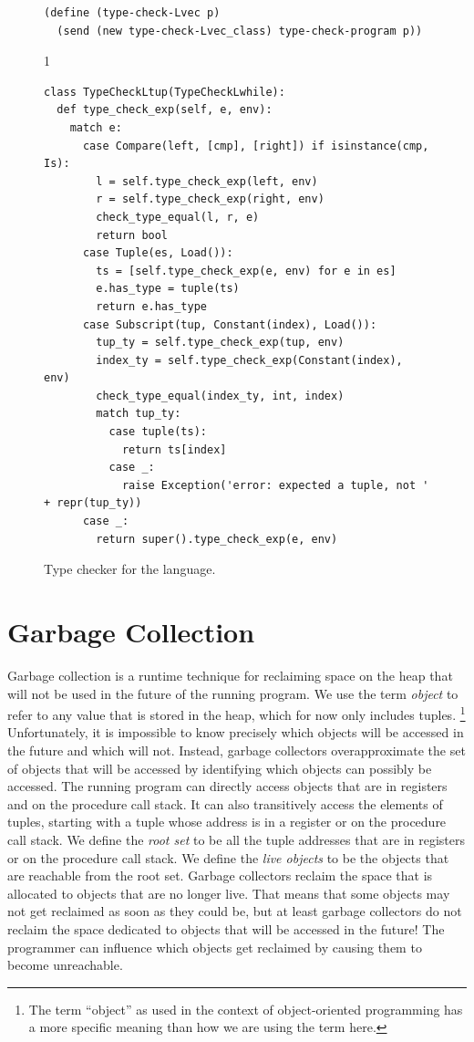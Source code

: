 \documentclass[7x10,nocrop]{TimesAPriori_MIT}%
\def\pythonEd{1}
\def\edition{1}
\begin{document}
\begin{figure}[tp]
{\begin{lstlisting}[basicstyle=\ttfamily\scriptsize]
(define (type-check-Lvec p)
  (send (new type-check-Lvec_class) type-check-program p))
\end{lstlisting}
\fi}
{\if\edition\pythonEd
\begin{lstlisting}
class TypeCheckLtup(TypeCheckLwhile):
  def type_check_exp(self, e, env):
    match e:
      case Compare(left, [cmp], [right]) if isinstance(cmp, Is):
        l = self.type_check_exp(left, env)
        r = self.type_check_exp(right, env)
        check_type_equal(l, r, e)
        return bool
      case Tuple(es, Load()):
        ts = [self.type_check_exp(e, env) for e in es]
        e.has_type = tuple(ts)
        return e.has_type
      case Subscript(tup, Constant(index), Load()):
        tup_ty = self.type_check_exp(tup, env)
        index_ty = self.type_check_exp(Constant(index), env)
        check_type_equal(index_ty, int, index)
        match tup_ty:
          case tuple(ts):
            return ts[index]
          case _:
            raise Exception('error: expected a tuple, not ' + repr(tup_ty))
      case _:
        return super().type_check_exp(e, env)
\end{lstlisting}
\fi}
\caption{Type checker for the \LangVec{} language.}
\label{fig:type-check-Lvec}
\end{figure}


\section{Garbage Collection}
\label{sec:GC}

Garbage collection is a runtime technique for reclaiming space on the
heap that will not be used in the future of the running program. We
use the term \emph{object} to refer to any
value that is stored in the heap, which for now only includes
tuples.%
%
\footnote{The term ``object'' as used in the context of
object-oriented programming has a more specific meaning than how we
are using the term here.}
%
Unfortunately, it is impossible to know precisely which objects will
be accessed in the future and which will not.  Instead, garbage
collectors overapproximate the set of objects that will be accessed by
identifying which objects can possibly be accessed.  The running
program can directly access objects that are in registers and on the
procedure call stack. It can also transitively access the elements of
tuples, starting with a tuple whose address is in a register or on the
procedure call stack.  We define the \emph{root
set} to be all the tuple addresses that are
in registers or on the procedure call stack.  We define the \emph{live
objects} to be the objects that are
reachable from the root set. Garbage collectors reclaim the space that
is allocated to objects that are no longer live.  That means that some
objects may not get reclaimed as soon as they could be, but at least
garbage collectors do not reclaim the space dedicated to objects that
will be accessed in the future! The programmer can influence which
objects get reclaimed by causing them to become unreachable.
\end{document}
